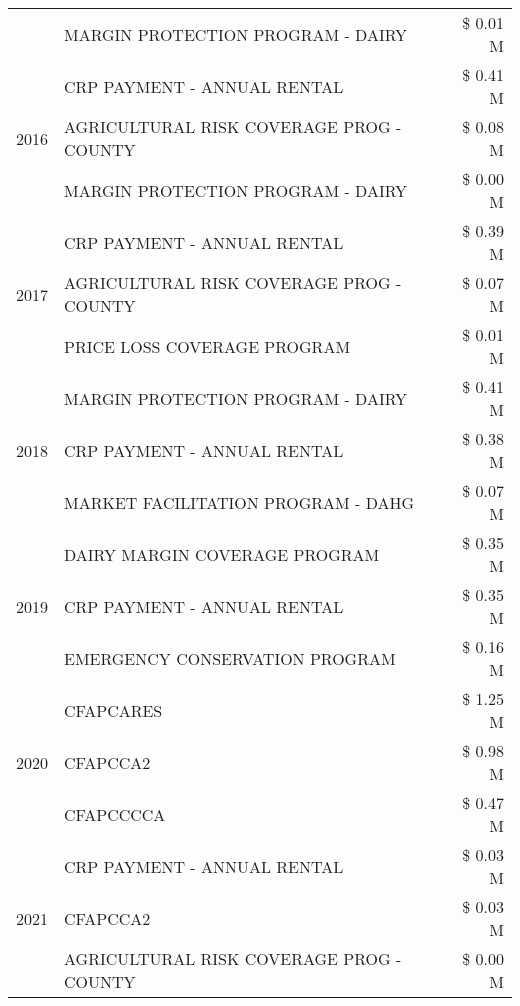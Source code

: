 \begin{tabular}{llr}
 & MARGIN PROTECTION PROGRAM - DAIRY & \$ 0.01 M \\
\cline{1-3}
\multirow[t]{3}{*}{2016} & CRP PAYMENT - ANNUAL RENTAL & \$ 0.41 M \\
 & AGRICULTURAL RISK COVERAGE PROG - COUNTY & \$ 0.08 M \\
 & MARGIN PROTECTION PROGRAM - DAIRY & \$ 0.00 M \\
\cline{1-3}
\multirow[t]{3}{*}{2017} & CRP PAYMENT - ANNUAL RENTAL & \$ 0.39 M \\
 & AGRICULTURAL RISK COVERAGE PROG - COUNTY & \$ 0.07 M \\
 & PRICE LOSS COVERAGE PROGRAM & \$ 0.01 M \\
\cline{1-3}
\multirow[t]{3}{*}{2018} & MARGIN PROTECTION PROGRAM - DAIRY & \$ 0.41 M \\
 & CRP PAYMENT - ANNUAL RENTAL & \$ 0.38 M \\
 & MARKET FACILITATION PROGRAM - DAHG & \$ 0.07 M \\
\cline{1-3}
\multirow[t]{3}{*}{2019} & DAIRY MARGIN COVERAGE PROGRAM & \$ 0.35 M \\
 & CRP PAYMENT - ANNUAL RENTAL & \$ 0.35 M \\
 & EMERGENCY CONSERVATION PROGRAM & \$ 0.16 M \\
\cline{1-3}
\multirow[t]{3}{*}{2020} & CFAPCARES & \$ 1.25 M \\
 & CFAPCCA2 & \$ 0.98 M \\
 & CFAPCCCCA & \$ 0.47 M \\
\cline{1-3}
\multirow[t]{3}{*}{2021} & CRP PAYMENT - ANNUAL RENTAL & \$ 0.03 M \\
 & CFAPCCA2 & \$ 0.03 M \\
 & AGRICULTURAL RISK COVERAGE PROG - COUNTY & \$ 0.00 M \\
\cline{1-3}
\bottomrule
\end{tabular}
